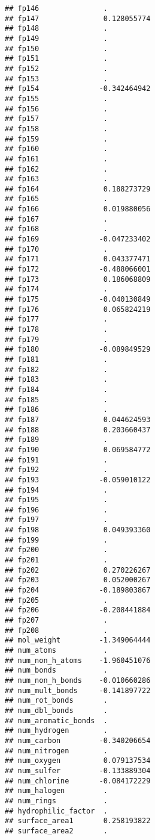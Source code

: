 \documentclass[]{article}
\begin{document}
\begin{verbatim}
## fp146               .          
## fp147               0.128055774
## fp148               .          
## fp149               .          
## fp150               .          
## fp151               .          
## fp152               .          
## fp153               .          
## fp154              -0.342464942
## fp155               .          
## fp156               .          
## fp157               .          
## fp158               .          
## fp159               .          
## fp160               .          
## fp161               .          
## fp162               .          
## fp163               .          
## fp164               0.188273729
## fp165               .          
## fp166               0.019880056
## fp167               .          
## fp168               .          
## fp169              -0.047233402
## fp170               .          
## fp171               0.043377471
## fp172              -0.488066001
## fp173               0.186068809
## fp174               .          
## fp175              -0.040130849
## fp176               0.065824219
## fp177               .          
## fp178               .          
## fp179               .          
## fp180              -0.089849529
## fp181               .          
## fp182               .          
## fp183               .          
## fp184               .          
## fp185               .          
## fp186               .          
## fp187               0.044624593
## fp188               0.203660437
## fp189               .          
## fp190               0.069584772
## fp191               .          
## fp192               .          
## fp193              -0.059010122
## fp194               .          
## fp195               .          
## fp196               .          
## fp197               .          
## fp198               0.049393360
## fp199               .          
## fp200               .          
## fp201               .          
## fp202               0.270226267
## fp203               0.052000267
## fp204              -0.189803867
## fp205               .          
## fp206              -0.208441884
## fp207               .          
## fp208               .          
## mol_weight         -1.349064444
## num_atoms           .          
## num_non_h_atoms    -1.960451076
## num_bonds           .          
## num_non_h_bonds    -0.010660286
## num_mult_bonds     -0.141897722
## num_rot_bonds       .          
## num_dbl_bonds       .          
## num_aromatic_bonds  .          
## num_hydrogen        .          
## num_carbon         -0.340206654
## num_nitrogen        .          
## num_oxygen          0.079137534
## num_sulfer         -0.133889304
## num_chlorine       -0.084172229
## num_halogen         .          
## num_rings           .          
## hydrophilic_factor  .          
## surface_area1       0.258193822
## surface_area2       .
\end{verbatim}
\end{document}
